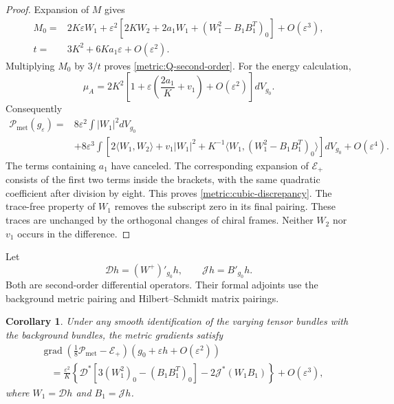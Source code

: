 \documentclass[11pt]{article}
\numberwithin{equation}{section}
\newtheorem{corollary}[theorem]{Corollary}
\theoremstyle{definition}
\theoremstyle{remark}
\begin{document}
\begin{proof}
Expansion of $M$ gives
\begin{align*}
 M_0={}&2K\varepsilon W_1
 +\varepsilon^2\left[2KW_2+2a_1W_1
 +(W_1^2-B_1B_1^T)_0\right]+O(\varepsilon^3),\\
 t={}&3K^2+6Ka_1\varepsilon+O(\varepsilon^2).
\end{align*}
Multiplying $M_0$ by $3/t$ proves \eqref{metric:Q-second-order}.
For the energy calculation,
\[
 \mu_A=2K^2\left[1+\varepsilon\left(\frac{2a_1}{K}+v_1\right)
 +O(\varepsilon^2)\right]dV_{g_0}.
\]
Consequently
\begin{align*}
 \mathcal P_{\mathrm{met}}(g_\varepsilon)
 ={}&8\varepsilon^2\int |W_1|^2dV_{g_0}\\
 &+8\varepsilon^3\int\left[
 2\langle W_1,W_2\rangle+v_1|W_1|^2
 +K^{-1}\langle W_1,(W_1^2-B_1B_1^T)_0\rangle
 \right]dV_{g_0}+O(\varepsilon^4).
\end{align*}
The terms containing $a_1$ have canceled.
The corresponding expansion of $\mathcal E_+$ consists of the first two
terms inside the brackets, with the same quadratic coefficient after
division by eight. This proves \eqref{metric:cubic-discrepancy}.
The trace-free property of $W_1$ removes the subscript zero in its final
pairing. These traces are unchanged by the orthogonal changes of chiral
frames. Neither $W_2$ nor $v_1$ occurs in the difference.
\end{proof}

Let
\begin{equation}\label{metric:D-J-definitions}
 \mathcal D h=(W^+)'_{g_0}h,\qquad
 \mathcal J h=B'_{g_0}h.
\end{equation}
Both are second-order differential operators. Their formal adjoints use
the background metric pairing and Hilbert--Schmidt matrix pairings.

\begin{corollary}\label{cor:metric-gradient-discrepancy}
Under any smooth identification of the varying tensor bundles with the
background bundles, the metric gradients satisfy
\begin{align}
 &\operatorname{grad}\left(\frac18\mathcal P_{\mathrm{met}}
 -\mathcal E_+\right)(g_0+\varepsilon h+O(\varepsilon^2))
 \label{metric:gradient-discrepancy}\\
 &\quad=\frac{\varepsilon^2}{K}
 \left\{\mathcal D^*\left[3(W_1^2)_0-(B_1B_1^T)_0\right]
 -2\mathcal J^*(W_1B_1)\right\}+O(\varepsilon^3),
 \nonumber
\end{align}
where $W_1=\mathcal Dh$ and $B_1=\mathcal Jh$.
\end{corollary}
\end{document}
